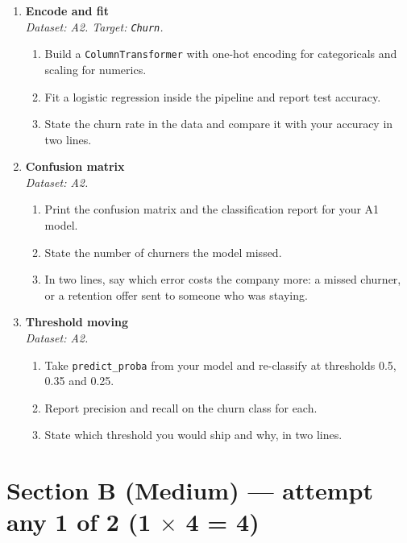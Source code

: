 \documentclass[11pt,a4paper]{article}
\begin{document}
\begin{enumerate}[label=\textbf{A\arabic*.}, leftmargin=*]

  \item \textbf{Encode and fit} \\
    \emph{Dataset: A2. Target: \texttt{Churn}.}
    \begin{enumerate}[label=(\alph*), leftmargin=*]
      \item Build a \texttt{ColumnTransformer} with one-hot encoding for categoricals and scaling for numerics.
      \item Fit a logistic regression inside the pipeline and report test accuracy.
      \item State the churn rate in the data and compare it with your accuracy in two lines.
    \end{enumerate}

  \item \textbf{Confusion matrix} \\
    \emph{Dataset: A2.}
    \begin{enumerate}[label=(\alph*), leftmargin=*]
      \item Print the confusion matrix and the classification report for your A1 model.
      \item State the number of churners the model missed.
      \item In two lines, say which error costs the company more: a missed churner, or a retention offer sent to someone who was staying.
    \end{enumerate}

  \item \textbf{Threshold moving} \\
    \emph{Dataset: A2.}
    \begin{enumerate}[label=(\alph*), leftmargin=*]
      \item Take \texttt{predict\_proba} from your model and re-classify at thresholds 0.5, 0.35 and 0.25.
      \item Report precision and recall on the churn class for each.
      \item State which threshold you would ship and why, in two lines.
    \end{enumerate}

\end{enumerate}

\section*{Section B (Medium) --- attempt any 1 of 2 \quad (1 $\times$ 4 = 4)}
\end{document}
